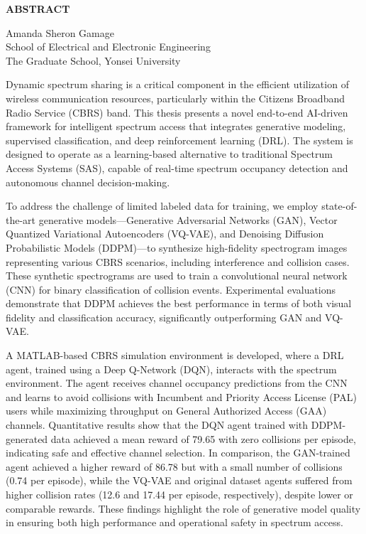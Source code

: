 \clearpage
\begin{centering}
\textbf{ABSTRACT}\\
\vspace{\baselineskip}
\end{centering}

\begin{flushright}
     Amanda Sheron Gamage \\
    School of Electrical and Electronic Engineering \\
    The Graduate School, Yonsei University
\end{flushright}

Dynamic spectrum sharing is a critical component in the efficient utilization of wireless communication resources, particularly within the Citizens Broadband Radio Service (CBRS) band. This thesis presents a novel end-to-end AI-driven framework for intelligent spectrum access that integrates generative modeling, supervised classification, and deep reinforcement learning (DRL). The system is designed to operate as a learning-based alternative to traditional Spectrum Access Systems (SAS), capable of real-time spectrum occupancy detection and autonomous channel decision-making.

To address the challenge of limited labeled data for training, we employ state-of-the-art generative models—Generative Adversarial Networks (GAN), Vector Quantized Variational Autoencoders (VQ-VAE), and Denoising Diffusion Probabilistic Models (DDPM)—to synthesize high-fidelity spectrogram images representing various CBRS scenarios, including interference and collision cases. These synthetic spectrograms are used to train a convolutional neural network (CNN) for binary classification of collision events. Experimental evaluations demonstrate that DDPM achieves the best performance in terms of both visual fidelity and classification accuracy, significantly outperforming GAN and VQ-VAE.

A MATLAB-based CBRS simulation environment is developed, where a DRL agent, trained using a Deep Q-Network (DQN), interacts with the spectrum environment. The agent receives channel occupancy predictions from the CNN and learns to avoid collisions with Incumbent and Priority Access License (PAL) users while maximizing throughput on General Authorized Access (GAA) channels. Quantitative results show that the DQN agent trained with DDPM-generated data achieved a mean reward of 79.65 with zero collisions per episode, indicating safe and effective channel selection. In comparison, the GAN-trained agent achieved a higher reward of 86.78 but with a small number of collisions (0.74 per episode), while the VQ-VAE and original dataset agents suffered from higher collision rates (12.6 and 17.44 per episode, respectively), despite lower or comparable rewards. These findings highlight the role of generative model quality in ensuring both high performance and operational safety in spectrum access.

